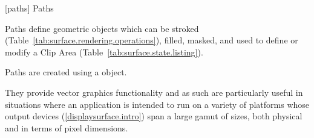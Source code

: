 
 [paths] {Paths}

\pnum
Paths define geometric objects which can be stroked (Table~\ref{tab:surface.rendering.operations}), filled, masked, and used to define or modify a Clip Area (Table~\ref{tab:surface.state.listing}).

\pnum
Paths are created using a  object.

\pnum
They provide vector graphics functionality and as such are particularly useful in situations where an application is intended to run on a variety of platforms whose output devices (\ref{displaysurface.intro}) span a large gamut of sizes, both physical and in terms of pixel dimensions.

\addtocounter{SectionDepthBase}{1}



\addtocounter{SectionDepthBase}{1}














\addtocounter{SectionDepthBase}{-1}


\addtocounter{SectionDepthBase}{-1}
